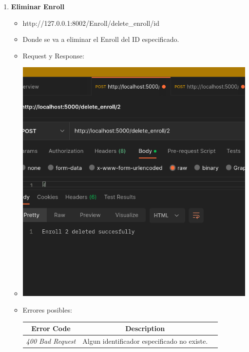 \documentclass{article}
\begin{document}
\begin{enumerate}
    \item \textbf{Eliminar Enroll}
    \begin{itemize}
        \item http://127.0.0.1:8002/Enroll/delete\_enroll/id
        \item Donde se va a eliminar el Enroll del ID especificado.
        \item Request y Response:
        \item \includegraphics[scale=.5]{assets/enroll/delete.png}
        \item Errores posibles: \begin{table}[H] \centering
        \begin{tabular}{|c|c|l|} \hline \textbf{Error Code} &
        \textbf{Description} \\ \hline \textit{400 Bad Request} & Algun
        identificador especificado no existe. \\ \hline \end{tabular}
        \end{table}
    \end{itemize}
\end{enumerate}

\end{document}
